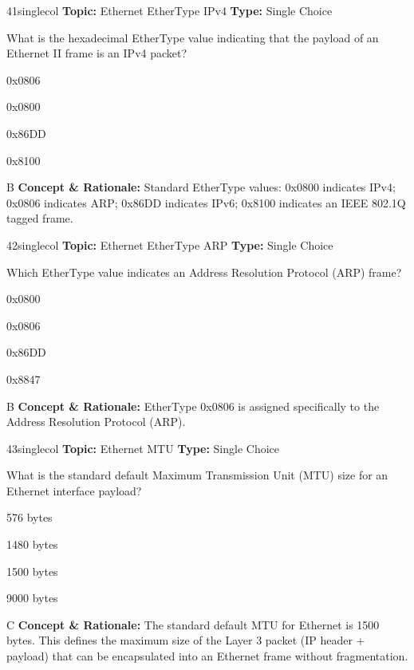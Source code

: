 \begin{qcard}{41}{singlecol}
\textcolor{darkslate!75}{\small\textbf{Topic:} Ethernet EtherType IPv4 \hfill \textbf{Type:} Single Choice}\vspace{0.4em}\par
What is the hexadecimal EtherType value indicating that the payload of an Ethernet II frame is an IPv4 packet?
\begin{qoptions}
\item 0x0806
\item 0x0800
\item 0x86DD
\item 0x8100
\end{qoptions}
\end{qcard}
\nopagebreak
\begin{explainbox}{B}
\textbf{Concept \& Rationale:} Standard EtherType values: 0x0800 indicates IPv4; 0x0806 indicates ARP; 0x86DD indicates IPv6; 0x8100 indicates an IEEE 802.1Q tagged frame.
\end{explainbox}

\begin{qcard}{42}{singlecol}
\textcolor{darkslate!75}{\small\textbf{Topic:} Ethernet EtherType ARP \hfill \textbf{Type:} Single Choice}\vspace{0.4em}\par
Which EtherType value indicates an Address Resolution Protocol (ARP) frame?
\begin{qoptions}
\item 0x0800
\item 0x0806
\item 0x86DD
\item 0x8847
\end{qoptions}
\end{qcard}
\nopagebreak
\begin{explainbox}{B}
\textbf{Concept \& Rationale:} EtherType 0x0806 is assigned specifically to the Address Resolution Protocol (ARP).
\end{explainbox}

\begin{qcard}{43}{singlecol}
\textcolor{darkslate!75}{\small\textbf{Topic:} Ethernet MTU \hfill \textbf{Type:} Single Choice}\vspace{0.4em}\par
What is the standard default Maximum Transmission Unit (MTU) size for an Ethernet interface payload?
\begin{qoptions}
\item 576 bytes
\item 1480 bytes
\item 1500 bytes
\item 9000 bytes
\end{qoptions}
\end{qcard}
\nopagebreak
\begin{explainbox}{C}
\textbf{Concept \& Rationale:} The standard default MTU for Ethernet is 1500 bytes. This defines the maximum size of the Layer 3 packet (IP header + payload) that can be encapsulated into an Ethernet frame without fragmentation.
\end{explainbox}

